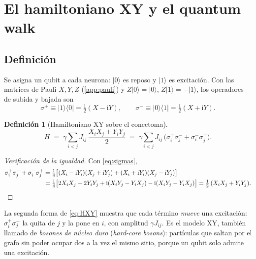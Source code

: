 \documentclass[11pt,a4paper]{article}
\renewcommand{\ket}[1]{\lvert #1\rangle}
\renewcommand{\bra}[1]{\langle #1\rvert}
\newcommand{\ii}{\mathrm{i}}
\theoremstyle{plain}
\theoremstyle{definition}
\newtheorem{definicion}[proposicion]{Definición}
\theoremstyle{remark}
\begin{document}
\section{El hamiltoniano XY y el quantum walk}
\label{sec:xy}

\subsection{Definición}

Se asigna un qubit a cada neurona: $\ket{0}$ es reposo y $\ket{1}$ es excitación. Con las matrices de Pauli $X,Y,Z$ (\cref{app:pauli}) y $Z\ket{0}=\ket{0}$, $Z\ket{1}=-\ket{1}$, los operadores de subida y bajada son
\begin{equation}
\sigma^+ \equiv \ket{1}\!\bra{0} = \tfrac12(X-\ii Y),
\qquad
\sigma^- \equiv \ket{0}\!\bra{1} = \tfrac12(X+\ii Y).
\label{eq:sigmas}
\end{equation}

\begin{definicion}[Hamiltoniano XY sobre el conectoma]
\begin{equation}
H \;=\; \gamma\sum_{i<j} J_{ij}\,\frac{X_iX_j+Y_iY_j}{2}
\;=\; \gamma\sum_{i<j} J_{ij}\,\bigl(\sigma_i^+\sigma_j^- + \sigma_i^-\sigma_j^+\bigr).
\label{eq:HXY}
\end{equation}
\end{definicion}

\begin{proof}[Verificación de la igualdad]
Con \eqref{eq:sigmas},
\begin{align*}
\sigma_i^+\sigma_j^- + \sigma_i^-\sigma_j^+
&= \tfrac14\bigl[(X_i-\ii Y_i)(X_j+\ii Y_j) + (X_i+\ii Y_i)(X_j-\ii Y_j)\bigr]\\
&= \tfrac14\bigl[2X_iX_j + 2Y_iY_j + \ii(X_iY_j - Y_iX_j) - \ii(X_iY_j - Y_iX_j)\bigr]
= \tfrac12\,(X_iX_j+Y_iY_j). \qedhere
\end{align*}
\end{proof}

La segunda forma de \eqref{eq:HXY} muestra que cada término \emph{mueve} una excitación: $\sigma_i^+\sigma_j^-$ la quita de $j$ y la pone en $i$, con amplitud $\gamma J_{ij}$. Es el modelo XY, también llamado de \emph{bosones de núcleo duro} (\emph{hard-core bosons}): partículas que saltan por el grafo sin poder ocupar dos a la vez el mismo sitio, porque un qubit solo admite una excitación.
\end{document}
